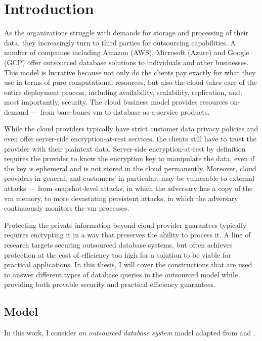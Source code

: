 \chapter{Introduction}
\thispagestyle{myheadings}

	As the organizations struggle with demands for storage and processing of their data, they increasingly turn to third parties for outsourcing capabilities.
	A number of companies including Amazon (AWS), Microsoft (Azure) and Google (GCP) offer outsourced database solutions to individuals and other businesses.
	This model is lucrative because not only do the clients pay exactly for what they use in terms of pure computational resources, but also the cloud takes care of the entire deployment process, including availability, scalability, replication, and, most importantly, security.
	The cloud business model provides resources on-demand --- from bare-bones \acrshort{vm} to database-as-a-service products.

	While the cloud providers typically have strict customer data privacy policies and even offer server-side encryption-at-rest services, the clients still have to trust the provider with their plaintext data.
	Server-side encryption-at-rest by definition requires the provider to know the encryption key to manipulate the data, even if the key is ephemeral and is not stored in the cloud permanently.
	Moreover, cloud providers in general, and customers'  in particular, may be vulnerable to external attacks --- from snapshot-level attacks, in which the adversary has a copy of the \acrshort{vm} memory, to more devastating persistent attacks, in which the adversary continuously monitors the \acrshort{vm} processes.

	Protecting the private information beyond cloud provider guarantees typically requires encrypting it in a way that preserves the ability to process it.
	A line of research targets securing outsourced database systems, but often achieves protection at the cost of efficiency too high for a solution to be viable for practical applications.
	In this thesis, I will cover the constructions that are used to answer different types of database queries in the outsourced model while providing both provable security and practical efficiency guarantees.

	\section{Model}

		In this work, I consider \emph{an outsourced database system} model adapted from \cite{generic-attacks-kellaris} and \cite{epsolute}.

